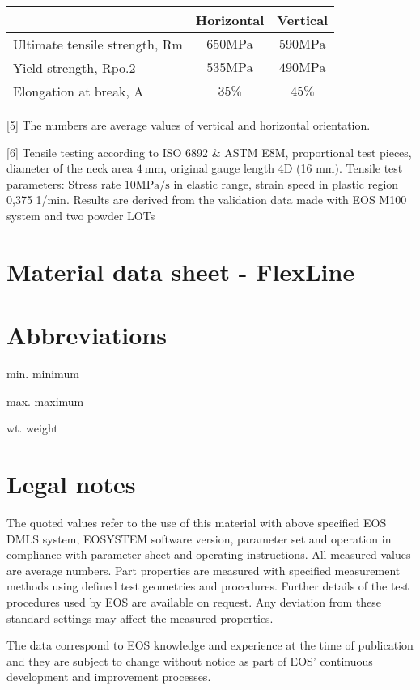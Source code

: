 \documentclass[10pt]{article}
\begin{document}
\begin{center}
\begin{tabular}{lcc}
\hline
 & Horizontal & Vertical \\
\hline
Ultimate tensile strength, $\mathrm{Rm}$ & $650 \mathrm{MPa}$ & $590 \mathrm{MPa}$ \\
\hline
Yield strength, Rpo.2 & $535 \mathrm{MPa}$ & $490 \mathrm{MPa}$ \\
\hline
Elongation at break, A & $35 \%$ & $45 \%$ \\
\hline
\end{tabular}
\end{center}

[5] The numbers are average values of vertical and horizontal orientation.

[6] Tensile testing according to ISO 6892 \& ASTM E8M, proportional test pieces, diameter of the neck area $4 \mathrm{~mm}$, original gauge length 4D (16 $\mathrm{mm})$. Tensile test parameters: Stress rate $10 \mathrm{MPa} / \mathrm{s}$ in elastic range, strain speed in plastic region 0,375 1/min. Results are derived from the validation data made with EOS M100 system and two powder LOTs

\section*{Material data sheet - FlexLine}
\section*{Abbreviations}
min. minimum

max. maximum

wt. weight

\section*{Legal notes}
The quoted values refer to the use of this material with above specified EOS DMLS system, EOSYSTEM software version, parameter set and operation in compliance with parameter sheet and operating instructions. All measured values are average numbers. Part properties are measured with specified measurement methods using defined test geometries and procedures. Further details of the test procedures used by EOS are available on request. Any deviation from these standard settings may affect the measured properties.

The data correspond to EOS knowledge and experience at the time of publication and they are subject to change without notice as part of EOS' continuous development and improvement processes.
\end{document}
